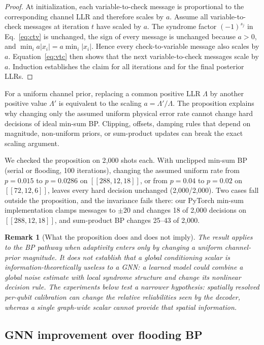 \documentclass[a4paper,twocolumn,11pt,nopdfoutputerror]{quantumarticle}
\newcommand{\code}[3]{\ensuremath{[\![#1,#2,#3]\!]}}
\newtheorem{remark}{Remark}
\begin{document}
\begin{proof}
At initialization, each variable-to-check message is proportional to the
corresponding channel LLR and therefore scales by $a$. Assume all
variable-to-check messages at iteration $t$ have scaled by $a$. The
syndrome factor $(-1)^{s_j}$ in Eq.~\eqref{eq:ctv} is unchanged, the sign
of every message is unchanged because $a>0$, and
$\min_i a|x_i|=a\min_i|x_i|$. Hence every check-to-variable message also
scales by $a$. Equation~\eqref{eq:vtc} then shows that the next
variable-to-check messages scale by $a$. Induction establishes the claim
for all iterations and for the final posterior LLRs.
\end{proof}

For a uniform channel prior, replacing a common positive LLR $\Lambda$
by another positive value $\Lambda'$ is equivalent to the scaling
$a=\Lambda'/\Lambda$. The proposition explains why changing only the assumed uniform physical
error rate cannot change hard decisions of ideal min-sum BP. Clipping, offsets, damping rules that depend on
magnitude, non-uniform priors, or sum-product updates can break the exact
scaling argument.

We checked the proposition on 2{,}000 shots each. With unclipped
min-sum BP (serial or flooding, 100 iterations), changing the assumed
uniform rate from $p=0.015$ to $p=0.0286$ on $\code{288}{12}{18}$, or from
$p=0.04$ to $p=0.02$ on $\code{72}{12}{6}$, leaves every hard decision
unchanged (2{,}000/2{,}000). Two cases fall outside the proposition, and
the invariance fails there: our PyTorch min-sum implementation clamps
messages to $\pm20$ and changes 18 of 2{,}000 decisions on
$\code{288}{12}{18}$, and sum-product BP changes 25--43 of 2{,}000.

\begin{remark}[What the proposition does and does not imply]
The result applies to the BP pathway when adaptivity enters only by
changing a uniform channel-prior magnitude. It does \emph{not} establish
that a global conditioning scalar is information-theoretically useless
to a GNN: a learned model could combine a global noise estimate with
local syndrome structure and change its nonlinear decision rule. The experiments below test a narrower hypothesis: spatially resolved
per-qubit calibration can change the relative reliabilities seen by the
decoder, whereas a single graph-wide scalar cannot provide that spatial
information.
\end{remark}

\subsection{GNN improvement over flooding BP}\label{sec:gnn_positive}
\end{document}
